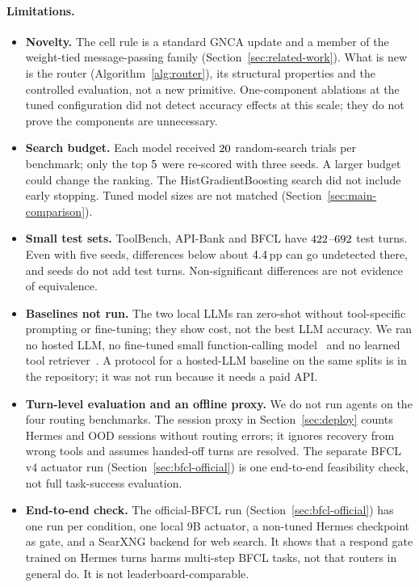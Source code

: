 \documentclass[10pt,twocolumn,letterpaper]{article}
\begin{document}
\paragraph{Limitations.}
\begin{itemize}[leftmargin=1.2em, itemsep=0.1em]
  \item \textbf{Novelty.} The cell rule is a standard GNCA update and a member of the weight-tied message-passing family (Section~\ref{sec:related-work}). What is new is the router (Algorithm~\ref{alg:router}), its structural properties and the controlled evaluation, not a new primitive. One-component ablations at the tuned configuration did not detect accuracy effects at this scale; they do not prove the components are unnecessary.
  \item \textbf{Search budget.} Each model received $20$ random-search trials per benchmark; only the top $5$ were re-scored with three seeds. A larger budget could change the ranking. The HistGradientBoosting search did not include early stopping. Tuned model sizes are not matched (Section~\ref{sec:main-comparison}).
  \item \textbf{Small test sets.} ToolBench, API-Bank and BFCL have $422$--$692$ test turns. Even with five seeds, differences below about $4.4$\,pp can go undetected there, and seeds do not add test turns. Non-significant differences are not evidence of equivalence.
  \item \textbf{Baselines not run.} The two local LLMs ran zero-shot without tool-specific prompting or fine-tuning; they show cost, not the best LLM accuracy. We ran no hosted LLM, no fine-tuned small function-calling model~\cite{chen2024octopus,erdogan2024tinyagent,lin2024hammer} and no learned tool retriever~\cite{qu2024colt}. A protocol for a hosted-LLM baseline on the same splits is in the repository; it was not run because it needs a paid API.
  \item \textbf{Turn-level evaluation and an offline proxy.} We do not run agents on the four routing benchmarks. The session proxy in Section~\ref{sec:deploy} counts Hermes and OOD sessions without routing errors; it ignores recovery from wrong tools and assumes handed-off turns are resolved. The separate BFCL v4 actuator run (Section~\ref{sec:bfcl-official}) is one end-to-end feasibility check, not full task-success evaluation.
  \item \textbf{End-to-end check.} The official-BFCL run (Section~\ref{sec:bfcl-official}) has one run per condition, one local 9B actuator, a non-tuned Hermes checkpoint as gate, and a SearXNG backend for web search. It shows that a respond gate trained on Hermes turns harms multi-step BFCL tasks, not that routers in general do. It is not leaderboard-comparable.

\end{itemize}
\end{document}
